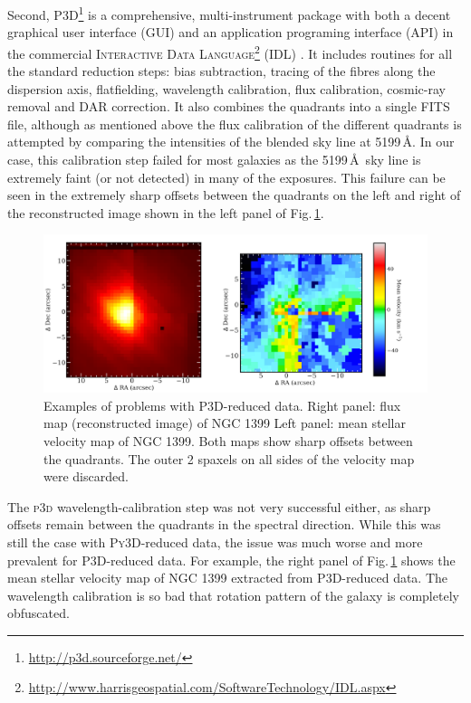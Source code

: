		Second, \textsc{P3D}\footnote{\url{http://p3d.sourceforge.net/}} is a comprehensive, multi-instrument package with both a decent graphical user interface (GUI) and an application programing interface (API) in the commercial \textsc{Interactive Data Language}\footnote{\url{http://www.harrisgeospatial.com/SoftwareTechnology/IDL.aspx}} (\textsc{IDL}) \citep{Sandin2010, Sandin2011}. It includes routines for all the standard reduction steps: bias subtraction, tracing of the fibres along the dispersion axis, flatfielding, wavelength calibration, flux calibration, cosmic-ray removal and DAR correction. It also combines the quadrants into a single FITS file, although as mentioned above the flux calibration of the different quadrants is attempted by comparing the intensities of the blended sky line at 5199\,\AA. In our case, this calibration step failed for most galaxies as the 5199\,\AA\ sky line is extremely faint (or not detected) in many of the exposures. This failure can be seen in the extremely sharp offsets between the quadrants on the left and right of the reconstructed image shown in the left panel of Fig.\,\ref{fig:P3D}. 

		\begin{figure}
			\centering
			\includegraphics[width=.9\textwidth]{chapter2/P3D_NGC1399.png}
			\caption[\textsc{P3D}-reduced data problems]{Examples of problems with \textsc{P3D}-reduced data. Right panel: flux map (reconstructed image) of NGC 1399 Left panel: mean stellar velocity map of NGC 1399. Both maps show sharp offsets between the quadrants. The outer 2 spaxels on all sides of the velocity map were discarded.}
			\label{fig:P3D}
		\end{figure}


		The \textsc{p3d} wavelength-calibration step was not very successful either, as sharp offsets remain between the quadrants in the spectral direction. While this was still the case with \textsc{Py3D}-reduced data, the issue was much worse and more prevalent for \textsc{P3D}-reduced data. For example, the right panel of Fig.\,\ref{fig:P3D} shows the mean stellar velocity map of NGC 1399 extracted from \textsc{P3D}-reduced data. The wavelength calibration is so bad that rotation pattern of the galaxy is completely obfuscated.

